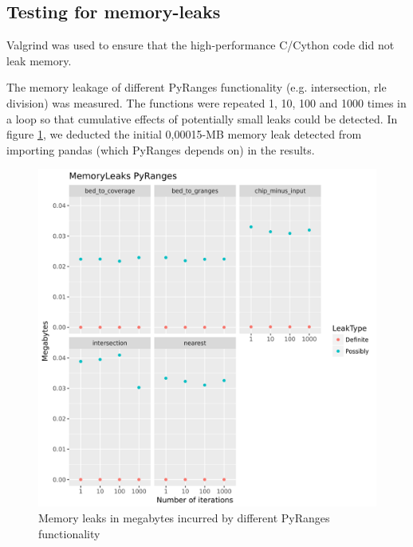 \documentclass[10pt,letterpaper]{article}
\begin{document}
\subsection*{Testing for memory-leaks}

Valgrind \cite{Nethercote:2007:SBM:1254810.1254820} was used to ensure that the
high-performance C/Cython code did not leak memory.

The memory leakage of different PyRanges functionality (e.g. intersection, rle
division) was measured. The functions were repeated 1, 10, 100 and 1000 times in
a loop so that cumulative effects of potentially small leaks could be detected.
In figure \ref{fig1}, we deducted the initial 0,00015-MB memory leak detected
from importing pandas (which PyRanges depends on) in the results.

\begin{figure}
\includegraphics[width=1\textwidth]{graphs/memleak.png}
\caption{Memory leaks in megabytes incurred by different PyRanges functionality} %
\label{fig1} %
\end{figure} %
\end{document}
